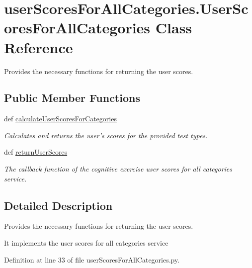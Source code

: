 \hypertarget{classuserScoresForAllCategories_1_1UserScoresForAllCategories}{\section{user\-Scores\-For\-All\-Categories.\-User\-Scores\-For\-All\-Categories Class Reference}
\label{classuserScoresForAllCategories_1_1UserScoresForAllCategories}
}


Provides the necessary functions for returning the user scores.  


\subsection*{Public Member Functions}
\begin{DoxyCompactItemize}
\item 
def \hyperlink{classuserScoresForAllCategories_1_1UserScoresForAllCategories_afce279b2a5d8d9d80b119b8fbb31dcb1}{calculate\-User\-Scores\-For\-Categories}
\begin{DoxyCompactList}\small\item\em Calculates and returns the user's scores for the provided test types. \end{DoxyCompactList}\item 
def \hyperlink{classuserScoresForAllCategories_1_1UserScoresForAllCategories_a53a65f94b7d9c533193473073bc2f180}{return\-User\-Scores}
\begin{DoxyCompactList}\small\item\em The callback function of the cognitive exercise user scores for all categories service. \end{DoxyCompactList}\end{DoxyCompactItemize}


\subsection{Detailed Description}
Provides the necessary functions for returning the user scores. 

It implements the user scores for all categories service 

Definition at line 33 of file user\-Scores\-For\-All\-Categories.\-py.



